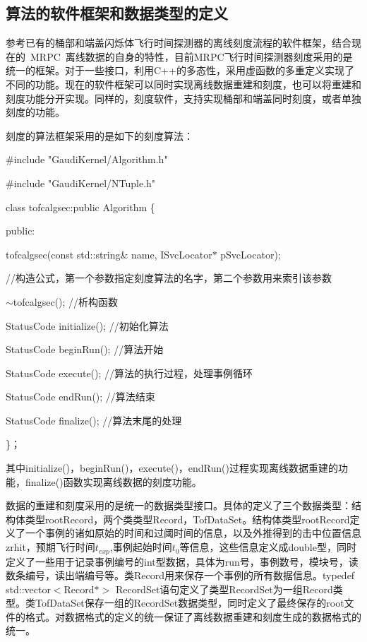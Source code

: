 \subsection{算法的软件框架和数据类型的定义}
参考已有的桶部和端盖闪烁体飞行时间探测器的离线刻度流程的软件框架，结合现在的~MRPC~离线数据的自身的特性，目前MRPC飞行时间探测器刻度采用的是统一的框架。对于一些接口，利用C++的多态性，采用虚函数的多重定义实现了不同的功能。现在的软件框架可以同时实现离线数据重建和刻度，也可以将重建和刻度功能分开实现。同样的，刻度软件，支持实现桶部和端盖同时刻度，或者单独刻度的功能。

刻度的算法框架采用的是如下的刻度算法：

\#include "GaudiKernel/Algorithm.h"

\#include "GaudiKernel/NTuple.h"

class tofcalgsec:public Algorithm \{

  public:

    \quad\quad tofcalgsec(const std::string\& name, ISvcLocator$*$ pSvcLocator);

    \quad\quad    //构造公式，第一个参数指定刻度算法的名字，第二个参数用来索引该参数

    \quad\quad $\sim$tofcalgsec();  //析构函数

    \quad\quad StatusCode initialize();    //初始化算法

    \quad\quad StatusCode beginRun();      //算法开始

    \quad\quad StatusCode execute();       //算法的执行过程，处理事例循环

    \quad\quad StatusCode endRun();        //算法结束

    \quad\quad StatusCode finalize();      //算法末尾的处理

\}；

其中initialize()，beginRun()，execute()，endRun()过程实现离线数据重建的功能，finalize()函数实现离线数据的刻度功能。

数据的重建和刻度采用的是统一的数据类型接口。具体的定义了三个数据类型：结构体类型rootRecord，两个类类型Record，TofDataSet。结构体类型rootRecord定义了一个事例的诸如原始的时间和过阈时间的信息，以及外推得到的击中位置信息zrhit，预期飞行时间$t_{exp}$,事例起始时间$t_{0}$等信息，这些信息定义成double型，同时定义了一些用于记录事例编号的int型数据，具体为run号，事例数号，模块号，读数条编号，读出端编号等。类Record用来保存一个事例的所有数据信息。typedef std::vector$<$Record$*$$>$ RecordSet语句定义了类型RecordSet为一组Record类型。类TofDataSet保存一组的RecordSet数据类型，同时定义了最终保存的root文件的格式。对数据格式的定义的统一保证了离线数据重建和刻度生成的数据格式的统一。

